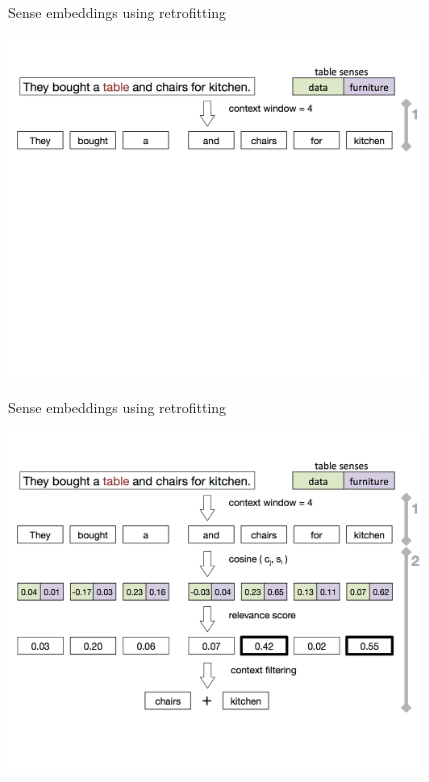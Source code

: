 \documentclass[usenames,dvipsnames]{beamer}
\begin{document}
\begin{frame}{Sense embeddings using retrofitting}
\vspace{-3em}
\begin{center}
\includegraphics[width=0.82\textwidth]{wsd-2}
\end{center}	
\end{frame}



\begin{frame}{Sense embeddings using retrofitting}
\vspace{-3em}
\begin{center}
\includegraphics[width=0.82\textwidth]{wsd-3}
\end{center}	
\end{frame}
\end{document}
